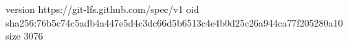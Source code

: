 version https://git-lfs.github.com/spec/v1
oid sha256:76b5c74c5adb4a447e5d4c3dc66d5b6513c4e4b0d25c26a944ca77f205280a10
size 3076
